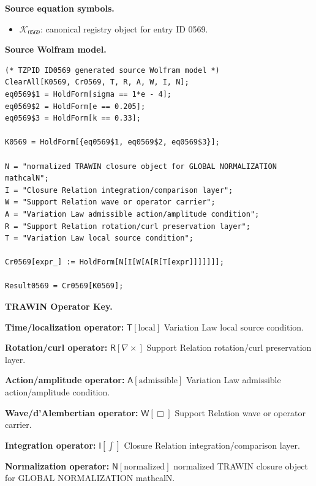 \begin{minipage}[t]{0.49\linewidth}
\begingroup
\small
\raggedright
\textbf{Source equation symbols.}\par
\begin{itemize}[leftmargin=1.35em,itemsep=1pt,topsep=1pt,parsep=0pt]
    \item $\mathcal{K}_{0569}$: canonical registry object for entry ID 0569.
\end{itemize}
\endgroup
\end{minipage}\hfill
\begin{minipage}[t]{0.47\linewidth}
\begingroup
\scriptsize
\raggedright
\textbf{Source Wolfram model.}\par
\begin{Verbatim}[fontsize=\tiny,breaklines=true,breakanywhere=true]
(* TZPID ID0569 generated source Wolfram model *)
ClearAll[K0569, Cr0569, T, R, A, W, I, N];
eq0569$1 = HoldForm[sigma == 1*e - 4];
eq0569$2 = HoldForm[e == 0.205];
eq0569$3 = HoldForm[k == 0.33];

K0569 = HoldForm[{eq0569$1, eq0569$2, eq0569$3}];

N = "normalized TRAWIN closure object for GLOBAL NORMALIZATION mathcalN";
I = "Closure Relation integration/comparison layer";
W = "Support Relation wave or operator carrier";
A = "Variation Law admissible action/amplitude condition";
R = "Support Relation rotation/curl preservation layer";
T = "Variation Law local source condition";

Cr0569[expr_] := HoldForm[N[I[W[A[R[T[expr]]]]]]];

Result0569 = Cr0569[K0569];
\end{Verbatim}
\endgroup
\end{minipage}

\par\vspace{0.45\baselineskip}
\noindent\begin{minipage}[t]{\linewidth}
\begingroup
\small
\raggedright
\textbf{TRAWIN Operator Key.}\par
\noindent\textbf{Time/localization operator:} $\mathsf{T}\!\left[\mathrm{local}\right]$ Variation Law local source condition.\par
\noindent\textbf{Rotation/curl operator:} $\mathsf{R}\!\left[\nabla\times\right]$ Support Relation rotation/curl preservation layer.\par
\noindent\textbf{Action/amplitude operator:} $\mathsf{A}\!\left[\mathrm{admissible}\right]$ Variation Law admissible action/amplitude condition.\par
\noindent\textbf{Wave/d'Alembertian operator:} $\mathsf{W}\!\left[\Box\right]$ Support Relation wave or operator carrier.\par
\noindent\textbf{Integration operator:} $\mathsf{I}\!\left[\int\right]$ Closure Relation integration/comparison layer.\par
\noindent\textbf{Normalization operator:} $\mathsf{N}\!\left[\mathrm{normalized}\right]$ normalized TRAWIN closure object for GLOBAL NORMALIZATION mathcalN.\par
\endgroup
\end{minipage}

